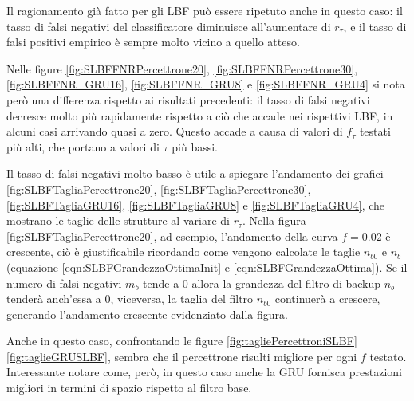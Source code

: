 \documentclass[../../main.tex]{subfiles}
\begin{document}
    Il ragionamento già fatto per gli LBF può essere ripetuto anche in questo caso: il tasso di falsi negativi del classificatore diminuisce all'aumentare di $r_{\tau}$, e il tasso di falsi positivi empirico è sempre molto vicino a quello atteso.

    Nelle figure \ref{fig:SLBFFNRPercettrone20}, \ref{fig:SLBFFNRPercettrone30}, \ref{fig:SLBFFNR_GRU16}, \ref{fig:SLBFFNR_GRU8} e \ref{fig:SLBFFNR_GRU4} si nota però una differenza rispetto ai risultati precedenti: il tasso di falsi negativi decresce molto più rapidamente rispetto a ciò che accade nei rispettivi LBF, in alcuni casi arrivando quasi a zero. Questo accade a causa di valori di $f_\tau$ testati più alti, che portano a valori di $\tau$ più bassi.

    Il tasso di falsi negativi molto basso è utile a spiegare l'andamento dei grafici \ref{fig:SLBFTagliaPercettrone20}, \ref{fig:SLBFTagliaPercettrone30}, \ref{fig:SLBFTagliaGRU16}, \ref{fig:SLBFTagliaGRU8} e \ref{fig:SLBFTagliaGRU4}, che mostrano le taglie delle strutture al variare di $r_\tau$. Nella figura \ref{fig:SLBFTagliaPercettrone20}, ad esempio, l'andamento della curva $f = 0.02$ è crescente, ciò è giustificabile ricordando come vengono calcolate le taglie $n_{b0}$ e $n_b$ (equazione \ref{eqn:SLBFGrandezzaOttimaInit} e \ref{eqn:SLBFGrandezzaOttima}). Se il numero di falsi negativi $m_b$ tende a 0 allora la grandezza del filtro di backup $n_b$ tenderà anch'essa a 0, viceversa, la taglia del filtro $n_{b0}$ continuerà a crescere, generando l'andamento crescente evidenziato dalla figura.

    Anche in questo caso, confrontando le figure \ref{fig:tagliePercettroniSLBF} \ref{fig:taglieGRUSLBF}, sembra che il percettrone risulti migliore per ogni $f$ testato. Interessante notare come, però, in questo caso anche la GRU fornisca prestazioni migliori in termini di spazio rispetto al filtro base.
\end{document}
